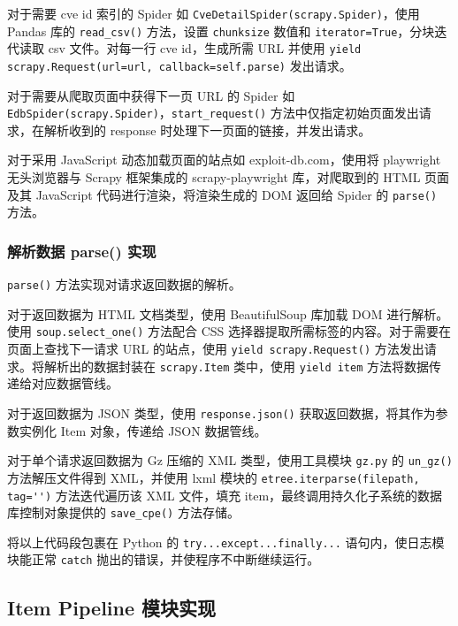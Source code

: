 \documentclass[a4paper,AutoFakeBold,oneside,12pt]{book}
\begin{document}
对于需要 cve id 索引的 Spider 如 \lstinline[style = python]|CveDetailSpider(scrapy.Spider)|，使用 Pandas 库的 \lstinline[style = python]|read_csv()| 方法，设置 \verb|chunksize| 数值和 \verb|iterator=True|，分块迭代读取 csv 文件。对每一行 cve id，生成所需 URL 并使用 \lstinline[style = python]|yield scrapy.Request(url=url, callback=self.parse)| 发出请求。

对于需要从爬取页面中获得下一页 URL 的 Spider 如 \lstinline[style = python]|EdbSpider(scrapy.Spider)|，\linebreak \lstinline[style = python]|start_request()| 方法中仅指定初始页面发出请求，在解析收到的 response 时处理下一页面的链接，并发出请求。

对于采用 JavaScript 动态加载页面的站点如 exploit-db.com，使用将 playwright 无头浏览器与 Scrapy 框架集成的 scrapy-playwright 库，对爬取到的 HTML 页面及其 JavaScript 代码进行渲染，将渲染生成的 DOM 返回给 Spider 的 \lstinline[style = python]|parse()| 方法。

\subsubsection{解析数据 parse() 实现}

\lstinline[style = python]|parse()| 方法实现对请求返回数据的解析。

对于返回数据为 HTML 文档类型，使用 BeautifulSoup 库加载 DOM 进行解析。使用 \lstinline[style = python]|soup.select_one()| 方法配合 CSS 选择器提取所需标签的内容。对于需要在页面上查找下一请求 URL 的站点，使用 \lstinline[style = python]|yield scrapy.Request()| 方法发出请求。将解析出的数据封装在 \lstinline[style = python]|scrapy.Item| 类中，使用 \lstinline[style = python]|yield item| 方法将数据传递给对应数据管线。

对于返回数据为 JSON 类型，使用 \lstinline[style = python]|response.json()| 获取返回数据，将其作为参数实例化 Item 对象，传递给 JSON 数据管线。

对于单个请求返回数据为 Gz 压缩的 XML 类型，使用工具模块 \lstinline[style = python]|gz.py| 的 \lstinline[style = python]|un_gz()| 方法解压文件得到 XML，并使用 lxml 模块的 \lstinline[style = python]|etree.iterparse(filepath, tag='')| 方法迭代遍历该 XML 文件，填充 item，最终调用持久化子系统的数据库控制对象提供的 \lstinline[style = python]|save_cpe()| 方法存储。

将以上代码段包裹在 Python 的 \lstinline|try...except...finally...| 语句内，使日志模块能正常 \lstinline|catch| 抛出的错误，并使程序不中断继续运行。

\subsection{Item Pipeline 模块实现}
\end{document}

